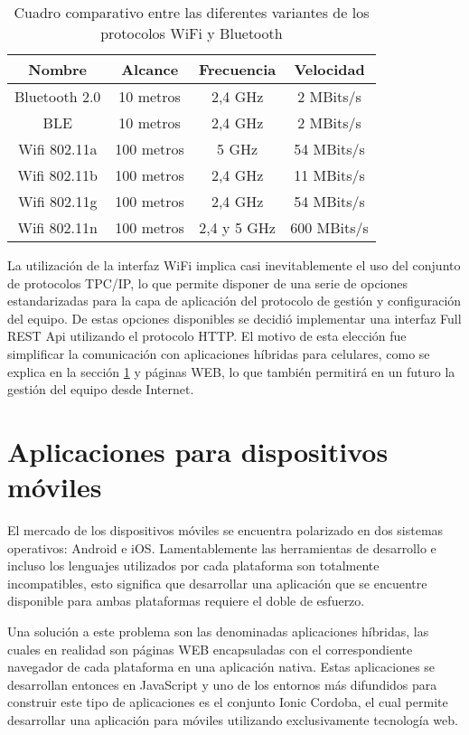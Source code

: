 \begin{table}[ht]
	\centering
	\caption[Comparación entre los protocolos Bluetooth y WiFi]{Cuadro comparativo entre las diferentes variantes de los protocolos WiFi y Bluetooth}
	\begin{tabular}{c c c c}
		\toprule
		\textbf{Nombre}	
		& \textbf{Alcance}
		& \textbf{Frecuencia}
		& \textbf{Velocidad}
		\\
		\midrule
		Bluetooth 2.0
		& 10 metros
		& 2,4 GHz
		& 2 MBits/s
		\\
		BLE
		& 10 metros
		& 2,4 GHz
		& 2 MBits/s
		\\
		Wifi 802.11a
		& 100 metros
		& 5 GHz
		& 54 MBits/s
		\\
		Wifi 802.11b
		& 100 metros
		& 2,4 GHz
		& 11 MBits/s
		\\
		Wifi 802.11g
		& 100 metros
		& 2,4 GHz
		& 54 MBits/s
		\\
		Wifi 802.11n
		& 100 metros
		& 2,4 y 5 GHz
		& 600 MBits/s
		\\
		\bottomrule
		\hline
	\end{tabular}
	\label{tab:WifiBluetooth}
\end{table}

La utilización de la interfaz WiFi implica casi inevitablemente el uso del conjunto de protocolos TPC/IP, lo que permite disponer de una serie de opciones estandarizadas para la capa de aplicación del protocolo de gestión y configuración del equipo. De estas opciones disponibles se decidió implementar una interfaz Full REST Api utilizando el protocolo HTTP. El motivo de esta elección fue simplificar la comunicación con aplicaciones híbridas para celulares, como se explica en la sección \ref{sec:AplicacionesMoviles} y páginas WEB, lo que también permitirá en un futuro la gestión del equipo desde Internet.

\section{Aplicaciones para dispositivos móviles}
\label{sec:AplicacionesMoviles}

El mercado de los dispositivos móviles se encuentra polarizado en dos sistemas operativos: Android e iOS. Lamentablemente las herramientas de desarrollo e incluso los lenguajes utilizados por cada plataforma son totalmente incompatibles, esto significa que desarrollar una aplicación que se encuentre disponible para ambas plataformas requiere el doble de esfuerzo. 

Una solución a este problema son las denominadas aplicaciones híbridas, las cuales en realidad son páginas WEB encapsuladas con el correspondiente navegador de cada plataforma en una aplicación nativa. Estas aplicaciones se desarrollan entonces en JavaScript y uno de los entornos más difundidos para construir este tipo de aplicaciones es el conjunto Ionic Cordoba, el cual permite desarrollar una aplicación para móviles utilizando exclusivamente tecnología web. 

